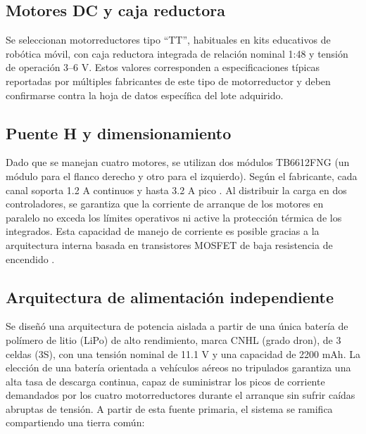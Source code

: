 \documentclass[journal]{IEEEtran}
\begin{document}
\subsection{Motores DC y caja reductora}
Se seleccionan motorreductores tipo ``TT'', habituales en kits educativos de robótica móvil, con caja reductora integrada de relación nominal 1:48 y tensión de operación 3--6 V. Estos valores corresponden a especificaciones típicas reportadas por múltiples fabricantes de este tipo de motorreductor y deben confirmarse contra la hoja de datos específica del lote adquirido.
 
\subsection{Puente H y dimensionamiento}
Dado que se manejan cuatro motores, se utilizan dos módulos TB6612FNG (un módulo para el flanco derecho y otro para el izquierdo). Según el fabricante, cada canal soporta 1.2 A continuos y hasta 3.2 A pico \cite{tb6612fng}. Al distribuir la carga en dos controladores, se garantiza que la corriente de arranque de los motores en paralelo no exceda los límites operativos ni active la protección térmica de los integrados. Esta capacidad de manejo de corriente es posible gracias a la arquitectura interna basada en transistores MOSFET de baja resistencia de encendido \cite{tb6612fng}.

\subsection{Arquitectura de alimentación independiente}
Se diseñó una arquitectura de potencia aislada a partir de una única batería de polímero de litio (LiPo) de alto rendimiento, marca CNHL (grado dron), de 3 celdas (3S), con una tensión nominal de 11.1 V y una capacidad de 2200 mAh. La elección de una batería orientada a vehículos aéreos no tripulados garantiza una alta tasa de descarga continua, capaz de suministrar los picos de corriente demandados por los cuatro motorreductores durante el arranque sin sufrir caídas abruptas de tensión. A partir de esta fuente primaria, el sistema se ramifica compartiendo una tierra común:
\end{document}

